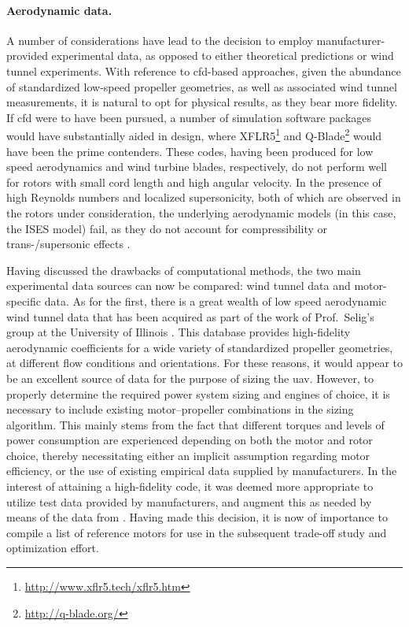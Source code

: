 \paragraph{Aerodynamic data.} A number of considerations have lead to the decision to employ manufacturer-provided experimental data, as opposed to either theoretical predictions or wind tunnel experiments. With reference to \gls{cfd}-based approaches, given the abundance of standardized low-speed propeller geometries, as well as associated wind tunnel measurements, it is natural to opt for physical results, as they bear more fidelity. If \gls{cfd} were to have been pursued, a number of simulation software packages would have substantially aided in design, where XFLR5\footnote{\url{http://www.xflr5.tech/xflr5.htm}} and Q-Blade\footnote{\url{http://q-blade.org/}} would have been the prime contenders. These codes, having been produced for low speed aerodynamics and wind turbine blades, respectively, do not perform well for rotors with small cord length and high angular velocity. In the presence of high Reynolds numbers and localized supersonicity, both of which are observed in the rotors under consideration, the underlying aerodynamic models (in this case, the ISES model) fail, as they do not account for compressibility or trans-/supersonic effects \citep{Drela1987}.

Having discussed the drawbacks of computational methods, the two main experimental data sources can now be compared: wind tunnel data and motor-specific data. As for the first, there is a great wealth of low speed aerodynamic wind tunnel data that has been acquired as part of the work of Prof.~Selig's group at the University of Illinois \citep{Brandt2019}. This database provides high-fidelity aerodynamic coefficients for a wide variety of standardized propeller geometries, at different flow conditions and orientations. For these reasons, it would appear to be an excellent source of data for the purpose of sizing the \gls{uav}. However, to properly determine the required power system sizing and engines of choice, it is necessary to include existing motor--propeller combinations in the sizing algorithm. This mainly stems from the fact that different torques and levels of power consumption are experienced depending on both the motor and rotor choice, thereby necessitating either an implicit assumption regarding motor efficiency, or the use of existing empirical data supplied by manufacturers. In the interest of attaining a high-fidelity code, it was deemed more appropriate to utilize test data provided by manufacturers, and augment this as needed by means of the data from \citep{Brandt2019}. Having made this decision, it is now of importance to compile a list of reference motors for use in the subsequent trade-off study and optimization effort.

